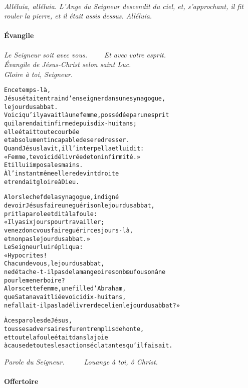 \documentclass[twoside]{article}
\begin{document}
\\
\emph{Alléluia, alléluia. L’Ange du Seigneur descendit du ciel, et, s’approchant, il fit rouler la pierre, et il était assis dessus. Alléluia.}

\paragraph{Évangile}

\emph{\vv Le Seigneur soit avec vous. ~~~~\rr Et avec votre esprit.\\
\vv Évangile de Jésus-Christ selon saint Luc. \\
\rr Gloire à toi, Seigneur.}

\begin{alltt}\normalfont
    En ce temps-là,
    Jésus était en train d’enseigner dans une synagogue,
        le jour du sabbat.
    Voici qu’il y avait là une femme, possédée par un esprit
        qui la rendait infirme depuis dix-huit ans ;
        elle était toute courbée
        et absolument incapable de se redresser.
    Quand Jésus la vit, il l’interpella et lui dit :
        « Femme, te voici délivrée de ton infirmité. »
    Et il lui imposa les mains.
    À l’instant même elle redevint droite
        et rendait gloire à Dieu.

    Alors le chef de la synagogue, indigné
        de voir Jésus faire une guérison le jour du sabbat,
        prit la parole et dit à la foule :
    « Il y a six jours pour travailler ;
        venez donc vous faire guérir ces jours-là,
        et non pas le jour du sabbat. »
    Le Seigneur lui répliqua :
        « Hypocrites !
    Chacun de vous, le jour du sabbat,
        ne détache-t-il pas de la mangeoire son bœuf ou son âne
        pour le mener boire ?
    Alors cette femme, une fille d’Abraham,
        que Satan avait liée voici dix-huit ans,
        ne fallait-il pas la délivrer de ce lien le jour du sabbat ? »

    À ces paroles de Jésus,
        tous ses adversaires furent remplis de honte,
        et toute la foule était dans la joie
        à cause de toutes les actions éclatantes qu’il faisait.
\end{alltt}

\emph{\vv Parole du Seigneur. ~~~~ \rr Louange à toi, ô Christ.}

\paragraph{Offertoire}
\end{document}
